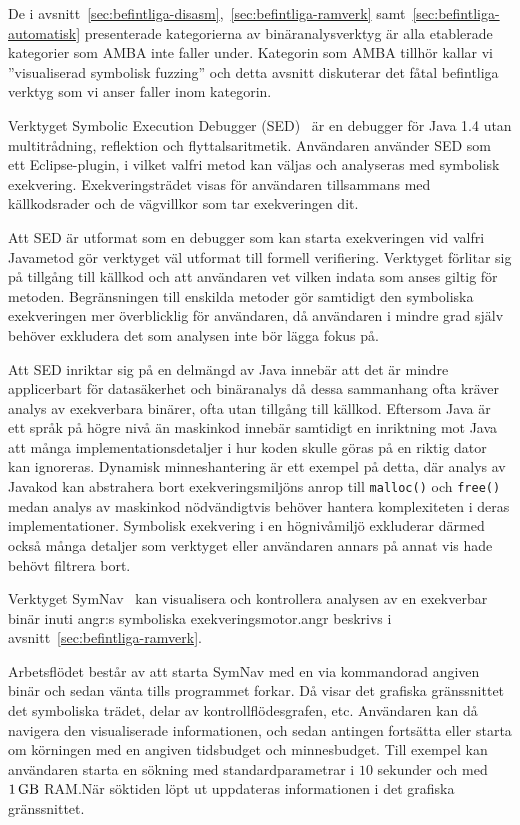 De i avsnitt~\ref{sec:befintliga-disasm},\ \ref{sec:befintliga-ramverk} samt\
\ref{sec:befintliga-automatisk} presenterade kategorierna av binäranalysverktyg
är alla etablerade kategorier som AMBA inte faller under. Kategorin som AMBA
tillhör kallar vi ''visualiserad symbolisk fuzzing'' och detta avsnitt
diskuterar det fåtal befintliga verktyg som vi anser faller inom kategorin.

Verktyget Symbolic Execution Debugger
(SED)~\cite{symbolic_execution_debugger} är en debugger för Java 1.4
utan multitrådning, reflektion och flyttalsaritmetik. Användaren använder
SED som ett Eclipse-plugin, i vilket valfri metod kan väljas och
analyseras med symbolisk exekvering. Exekveringsträdet visas för användaren
tillsammans med källkodsrader och de vägvillkor som tar exekveringen dit.

Att SED är utformat som en debugger som kan starta exekveringen vid
valfri Javametod gör verktyget väl utformat till formell verifiering. Verktyget
förlitar sig på tillgång till källkod och att användaren vet vilken indata som
anses giltig för metoden. Begränsningen till enskilda metoder gör samtidigt den
symboliska exekveringen mer överblicklig för användaren, då användaren i mindre
grad själv behöver exkludera det som analysen inte bör lägga fokus på.

Att SED inriktar sig på en delmängd av Java innebär att det är mindre
applicerbart för datasäkerhet och binäranalys då dessa sammanhang ofta kräver
analys av exekverbara binärer, ofta utan tillgång till källkod. Eftersom Java är
ett språk på högre nivå än maskinkod innebär samtidigt en inriktning mot Java
att många implementationsdetaljer i hur koden skulle göras på en riktig dator
kan ignoreras. Dynamisk minneshantering är ett exempel på detta, där analys av
Javakod kan abstrahera bort exekveringsmiljöns anrop till \verb|malloc()| och
\verb|free()| medan analys av maskinkod nödvändigtvis behöver hantera
komplexiteten i deras implementationer. Symbolisk exekvering i en högnivåmiljö
exkluderar därmed också många detaljer som verktyget eller användaren annars på
annat vis hade behövt filtrera bort.

Verktyget SymNav~\cite{symnav} kan visualisera och kontrollera analysen av en
exekverbar binär inuti angr:s symboliska exekveringsmotor.\@ angr beskrivs i
avsnitt~\ref{sec:befintliga-ramverk}.

Arbetsflödet består av att starta SymNav med en via kommandorad angiven binär
och sedan vänta tills programmet forkar. Då visar det grafiska gränssnittet det
symboliska trädet, delar av kontrollflödesgrafen, etc. Användaren kan då
navigera den visualiserade informationen, och sedan antingen fortsätta eller
starta om körningen med en angiven tidsbudget och minnesbudget. Till exempel kan
användaren starta en sökning med standardparametrar i $10$ sekunder och med
$\SI{1}{\giga\byte}$ RAM.\@ När söktiden löpt ut uppdateras informationen i
det grafiska gränssnittet.

